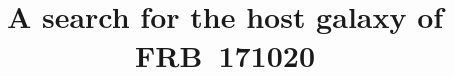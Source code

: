 \documentclass[twocolumn]{aastex63}
\begin{document}
\title{A search for the host galaxy of FRB~171020}


\end{document}
